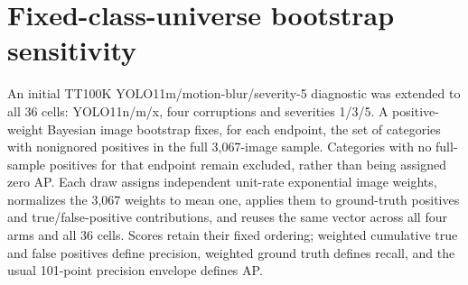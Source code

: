 \documentclass[10pt]{article}
\begin{document}
\begin{table}[htbp]
\centering
\caption{Descriptive two-way seed decomposition within each targeted
YOLO11m severity-5 block. The last three columns are percentages of the
within-block total sum of squares; Train$\times$cal. denotes non-additivity.}
\label{tab:multiseed-decomposition}
\scriptsize
{}
\end{table}

\FloatBarrier

\section{Fixed-class-universe bootstrap sensitivity}
\label{sec:supp-fixed-universe}

An initial TT100K YOLO11m/motion-blur/severity-5 diagnostic was extended to
all 36 cells: YOLO11n/m/x, four corruptions and severities 1/3/5. A
positive-weight Bayesian image bootstrap fixes, for each endpoint, the set of
categories with nonignored positives in the full 3,067-image sample. Categories
with no full-sample positives for that endpoint remain excluded, rather than
being assigned zero AP. Each draw assigns independent unit-rate
exponential image weights, normalizes the 3,067 weights to mean one, applies
them to ground-truth positives and true/false-positive contributions, and
reuses the same vector across all four arms and all 36 cells. Scores retain their fixed ordering;
weighted cumulative true and false positives define precision, weighted ground
truth defines recall, and the usual 101-point precision envelope defines AP.
\end{document}
